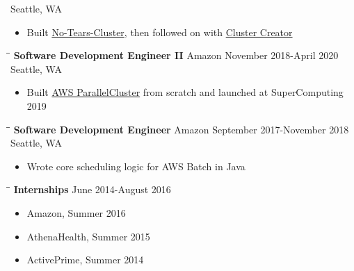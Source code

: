 \documentclass{res}
\begin{document}
\begin{resume}
\begin{tabbing}
                             \>Seattle, WA
   \end{tabbing}\vspace{-10pt}      %
   \begin{itemize}
   \setlength\itemsep{0em}
\item Built \href{https://github.com/aws-samples/no-tears-cluster}{No-Tears-Cluster}, then followed on with \href{https://cluster-creator.swsmith.cc/}{Cluster Creator}
    \end{itemize}
\vspace{-0.10in}
 \begin{tabbing}
   \hspace{2.5in}\= \hspace{2.6in}\= \kill %
    {\bf Software Development Engineer II} \>Amazon     \>November 2018-April 2020\\
                             \>Seattle, WA
   \end{tabbing}\vspace{-10pt}      %
   \begin{itemize}
   \setlength\itemsep{0em}
\item Built \href{https://github.com/aws/aws-parallelcluster}{AWS ParallelCluster} from scratch and launched at SuperComputing 2019
    \end{itemize}
\vspace{-0.10in}
 \begin{tabbing}
   \hspace{2.5in}\= \hspace{2.6in}\= \kill %
    {\bf Software Development Engineer} \>Amazon     \>September 2017-November 2018\\
                             \>Seattle, WA
   \end{tabbing}\vspace{-10pt}      %
   \begin{itemize}
   \setlength\itemsep{0em}
\item Wrote core scheduling logic for AWS Batch in Java
    \end{itemize}
\vspace{-0.15in}
 \begin{tabbing}
   \hspace{2.5in}\= \hspace{2.6in}\= \kill %
    {\bf Internships} \>     \>June 2014-August 2016
   \end{tabbing}\vspace{-10pt}      %
   \begin{itemize}
   \setlength\itemsep{0em}
   \item Amazon, Summer 2016
   \item AthenaHealth, Summer 2015
   \item ActivePrime, Summer 2014
    \end{itemize}

\end{resume}
\end{document}
